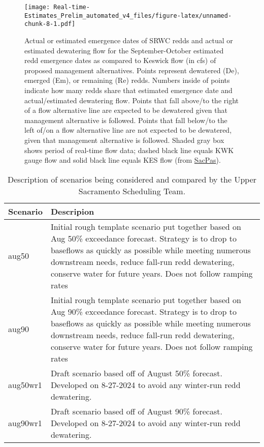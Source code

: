 \documentclass[
]{article}
\begin{document}
\begin{figure}
\centering
\texttt{[image: Real-time-Estimates\_Prelim\_automated\_v4\_files/figure-latex/unnamed-chunk-8-1.pdf]}
\caption{Actual or estimated emergence dates of SRWC redds and actual or
estimated dewatering flow for the September-October estimated redd
emergence dates as compared to Keswick flow (in cfs) of proposed
management alternatives. Points represent dewatered (De), emerged (Em),
or remaining (Re) redds. Numbers inside of points indicate how many
redds share that estimated emergence date and actual/estimated
dewatering flow. Points that fall above/to the right of a flow
alternative line are expected to be dewatered given that management
alternative is followed. Points that fall below/to the left of/on a flow
alternative line are not expected to be dewatered, given that management
alternative is followed. Shaded gray box shows period of real-time flow
data; dashed black line equals KWK gauge flow and solid black line
equals KES flow (from
\href{https://www.cbr.washington.edu/sacramento/data/query_river_table.html}{SacPas}).}
\end{figure}

\begin{table}

\caption{\label{tab:unnamed-chunk-9}Description of scenarios being considered and compared by the Upper Sacramento Scheduling Team.}
\centering
\begin{tabular}[t]{>{\raggedright\arraybackslash}p{2cm}|>{\raggedright\arraybackslash}p{14cm}}
\hline
Scenario & Descripion\\
\hline
aug50 & Initial rough template scenario put together based on Aug 50\% exceedance forecast. Strategy is to drop to baseflows as quickly as possible while meeting numerous downstream needs, reduce fall-run redd dewatering, conserve water for future years. Does not follow ramping rates\\
\hline
aug90 & Initial rough template scenario put together based on Aug 90\% exceedance forecast.  Strategy is to drop to baseflows as quickly as possible while meeting numerous downstream needs, reduce fall-run redd dewatering, conserve water for future years. Does not follow ramping rates\\
\hline
aug50wr1 & Draft scenario based off of August 50\% forecast. Developed on 8-27-2024 to avoid any winter-run redd dewatering.\\
\hline
aug90wr1 & Draft scenario based off of August 90\% forecast. Developed on 8-27-2024 to avoid any winter-run redd dewatering.\\
\hline
\end{tabular}
\end{table}
\end{document}
